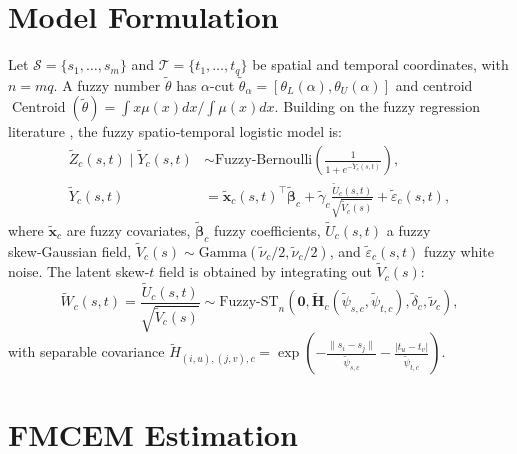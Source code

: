 \documentclass[twoside]{article}
\begin{document}
\section{Model Formulation}

Let \(\mathcal{S}=\{s_1,\dots,s_m\}\) and \(\mathcal{T}=\{t_1,\dots,t_q\}\) be spatial and temporal coordinates, with \(n=mq\). A fuzzy number \(\tilde{\theta}\) \citep{Zadeh1965} has \(\alpha\)-cut \(\tilde{\theta}_\alpha=[\theta_L(\alpha),\theta_U(\alpha)]\) and centroid \(\operatorname{Centroid}(\tilde{\theta})=\int x\mu(x)dx/\int\mu(x)dx\). Building on the fuzzy regression literature \citep{Maleki2024,Charizanos2024}, the fuzzy spatio‑temporal logistic model is:
\begin{align}
\tilde{Z}_c(s,t) \mid \tilde{Y}_c(s,t) &\sim \text{Fuzzy-Bernoulli}\!\left(\frac{1}{1+e^{-\tilde{Y}_c(s,t)}}\right),\\
\tilde{Y}_c(s,t) &= \tilde{\mathbf{x}}_c(s,t)^\top\tilde{\boldsymbol{\beta}}_c + \tilde{\gamma}_c \frac{\tilde{U}_c(s,t)}{\sqrt{\tilde{V}_c(s)}} + \tilde{\varepsilon}_c(s,t),
\end{align}
where \(\tilde{\mathbf{x}}_c\) are fuzzy covariates, \(\tilde{\boldsymbol{\beta}}_c\) fuzzy coefficients, \(\tilde{U}_c(s,t)\) a fuzzy skew‑Gaussian field, \(\tilde{V}_c(s)\sim \text{Gamma}(\tilde{\nu}_c/2,\tilde{\nu}_c/2)\), and \(\tilde{\varepsilon}_c(s,t)\) fuzzy white noise. The latent skew-\(t\) field is obtained by integrating out \(\tilde{V}_c(s)\):
\[
\tilde{W}_c(s,t)=\frac{\tilde{U}_c(s,t)}{\sqrt{\tilde{V}_c(s)}} \sim \text{Fuzzy-ST}_n\!\left(\mathbf{0},\tilde{\mathbf{H}}_c(\tilde{\psi}_{s,c},\tilde{\psi}_{t,c}),\tilde{\delta}_c,\tilde{\nu}_c\right),
\]
with separable covariance \(\tilde{H}_{(i,u),(j,v),c}=\exp\!\left(-\frac{\|s_i-s_j\|}{\tilde{\psi}_{s,c}}-\frac{|t_u-t_v|}{\tilde{\psi}_{t,c}}\right)\).

\section{FMCEM Estimation}
\end{document}
